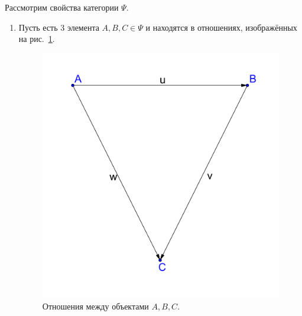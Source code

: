 \documentclass[a4paper, 12pt]{report}
\begin{document}
Рассмотрим свойства категории $\Psi$.
\begin{enumerate}
  \item Пусть есть 3 элемента $A, B, C \in \Psi$ и находятся в отношениях, изображённых на рис.~\ref{fig::property_1}.
      \begin{figure}[!htbp]
        \begin{center}
            \includegraphics[width=0.3\linewidth]{lect5/Properity1pic1.png}
        \end{center}
        \caption{Отношения между объектами $A,B,C$.}
        \label{fig::property_1}
      \end{figure}


\end{enumerate}
\end{document}

